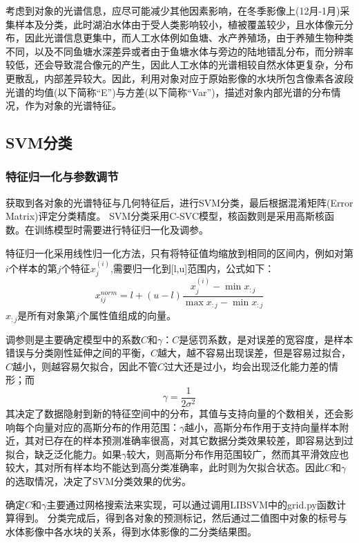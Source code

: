 \documentclass[supercite]{upcthesis}
\begin{document}
\begin{itemize}
考虑到对象的光谱信息，应尽可能减少其他因素影响，在冬季影像上(12月-1月)采集样本及分类，此时湖泊水体由于受人类影响较小，植被覆盖较少，且水体像元分布，因此光谱信息更集中，而人工水体例如鱼塘、水产养殖场，由于养殖生物种类不同，以及不同鱼塘水深差异或者由于鱼塘水体与旁边的陆地错乱分布，而分辨率较低，还会导致混合像元的产生，因此人工水体的光谱相较自然水体更复杂，分布更散乱，内部差异较大。因此，利用对象对应于原始影像的水块所包含像素各波段光谱的均值(以下简称“E”)与方差(以下简称“Var”)，描述对象内部光谱的分布情况，作为对象的光谱特征。
\end{itemize}
\subsection{SVM分类}
\subsubsection{特征归一化与参数调节}
获取到各对象的光谱特征与几何特征后，进行SVM分类，最后根据混淆矩阵(Error Matrix)评定分类精度。
SVM分类采用C-SVC模型，核函数则是采用高斯核函数。在训练模型时需要进行特征归一化及调参。

特征归一化采用线性归一化方法，只有将特征值均缩放到相同的区间内，例如对第$i$个样本的第$j$个特征$x_j^{(i)}$,需要归一化到[l,u]范围内，公式如下：
\begin{equation}
x_{ij}^{norm}=l+(u-l)\frac{x_j^{(i)}-\min x_{:j}}{\max x_{:j}-\min x_{:j}}
\end{equation}
$x_{:j}$是所有对象第$j$个属性值组成的向量。

调参则是主要确定模型中的系数$C$和$\gamma$：$C$是惩罚系数，是对误差的宽容度，是样本错误与分类刚性延伸之间的平衡，$C$越大，越不容易出现误差，但是容易过拟合，$C$越小，则越容易欠拟合，因此不管$C$过大还是过小，均会出现泛化能力差的情形；而
\begin{equation}
\gamma=\frac{1}{2\sigma^2}
\end{equation}
其决定了数据隐射到新的特征空间中的分布，其值与支持向量的个数相关，还会影响每个向量对应的高斯分布的作用范围：$\gamma$越小，高斯分布作用于支持向量样本附近，其对已存在的样本预测准确率很高，对其它数据分类效果较差，即容易达到过拟合，缺乏泛化能力。如果$\gamma$较大，则高斯分布作用范围较广，然而其平滑效应也较大，其对所有样本均不能达到高分类准确率，此时则为欠拟合状态。因此$C$和$\gamma$的选取情况，决定了SVM分类效果的优劣。

确定$C$和$\gamma$主要通过网格搜索法来实现，可以通过调用LIBSVM中的grid.py函数计算得到。
分类完成后，得到各对象的预测标记，然后通过二值图中对象的标号与水体影像中各水块的关系，得到水体影像的二分类结果图。
\end{document}

